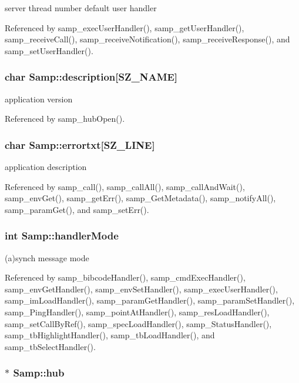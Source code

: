server thread number default user handler 

Referenced by samp\_\-execUserHandler(), samp\_\-getUserHandler(), samp\_\-receiveCall(), samp\_\-receiveNotification(), samp\_\-receiveResponse(), and samp\_\-setUserHandler().\hypertarget{structSamp_2c5f900be721a05d08b9eaaf024ebd42}{
\subsubsection[{description}]{\setlength{\rightskip}{0pt plus 5cm}char {\bf Samp::description}\mbox{[}SZ\_\-NAME\mbox{]}}}
\label{structSamp_2c5f900be721a05d08b9eaaf024ebd42}


application version 

Referenced by samp\_\-hubOpen().\hypertarget{structSamp_d3f7c585846e1e696b04807106d8087f}{
\subsubsection[{errortxt}]{\setlength{\rightskip}{0pt plus 5cm}char {\bf Samp::errortxt}\mbox{[}SZ\_\-LINE\mbox{]}}}
\label{structSamp_d3f7c585846e1e696b04807106d8087f}


application description 

Referenced by samp\_\-call(), samp\_\-callAll(), samp\_\-callAndWait(), samp\_\-envGet(), samp\_\-getErr(), samp\_\-GetMetadata(), samp\_\-notifyAll(), samp\_\-paramGet(), and samp\_\-setErr().\hypertarget{structSamp_14f6ed59a947504d37bd8cdd1f2f8e8d}{
\subsubsection[{handlerMode}]{\setlength{\rightskip}{0pt plus 5cm}int {\bf Samp::handlerMode}}}
\label{structSamp_14f6ed59a947504d37bd8cdd1f2f8e8d}


(a)synch message mode 

Referenced by samp\_\-bibcodeHandler(), samp\_\-cmdExecHandler(), samp\_\-envGetHandler(), samp\_\-envSetHandler(), samp\_\-execUserHandler(), samp\_\-imLoadHandler(), samp\_\-paramGetHandler(), samp\_\-paramSetHandler(), samp\_\-PingHandler(), samp\_\-pointAtHandler(), samp\_\-resLoadHandler(), samp\_\-setCallByRef(), samp\_\-specLoadHandler(), samp\_\-StatusHandler(), samp\_\-tbHighlightHandler(), samp\_\-tbLoadHandler(), and samp\_\-tbSelectHandler().\hypertarget{structSamp_7368fd66d8153c325dfffbb5652f3179}{
\subsubsection[{hub}]{$\ast$ {\bf Samp::hub}}}
\label{structSamp_7368fd66d8153c325dfffbb5652f3179}


